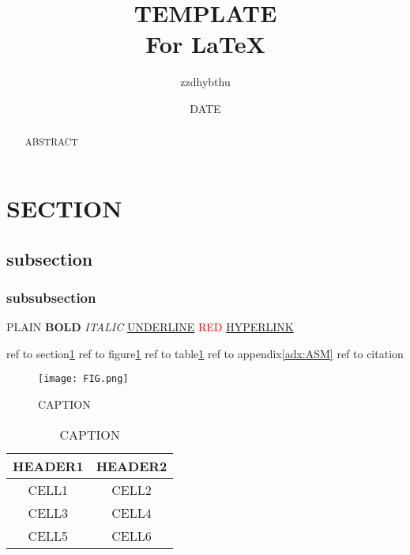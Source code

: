 \documentclass[a4paper]{article}  %
\begin{document}
\title{\textbf{TEMPLATE}\\For \LaTeX}  %
\author{zzdhybthu}
\date{DATE}
\maketitle

\tableofcontents

\newpage

\pagestyle{fancy}
\fancyhf{}
\renewcommand{\headrulewidth}{0.4pt}
\renewcommand{\footrulewidth}{0.4pt}

\begin{abstract}
    ABSTRACT
\end{abstract}

\section{SECTION}\label{sec:LABEL}
\subsection{subsection}
\subsubsection{subsubsection}

PLAIN
\textbf{BOLD}
\textit{ITALIC}
\underline{UNDERLINE}
\textcolor{red}{RED}
\href{https://www.eesast.com}{HYPERLINK}

ref to section\ref{sec:LABEL}
ref to figure\ref{fig:LABEL}
ref to table\ref{tab:LABEL}
ref to appendix\ref{adx:ASM}
ref to citation\cite{REF}

\begin{figure}[ht]  %
    \centering
    \texttt{[image: FIG.png]}  %
    \caption{CAPTION}\label{fig:LABEL}
\end{figure}

\begin{table}[htb]
    \centering
    \caption{CAPTION}\label{tab:LABEL}
    \begin{tabular}{cc}  %
        \toprule
        \textbf{HEADER1} & \textbf{HEADER2} \\
        \midrule
        CELL1 & CELL2 \\
        CELL3 & CELL4 \\
        CELL5 & CELL6 \\
        \bottomrule
    \end{tabular}
\end{table}
\end{document}
